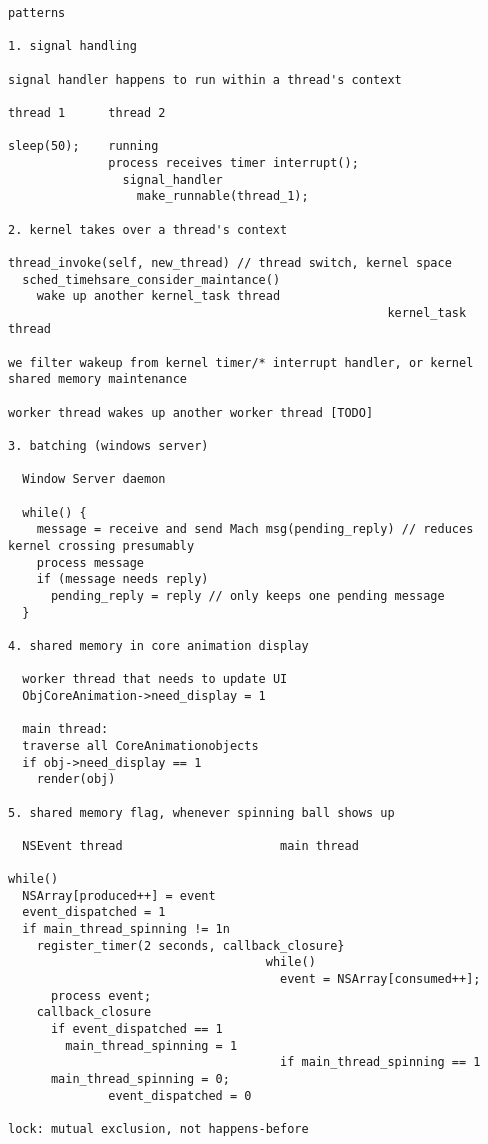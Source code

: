 \begin{verbatim}
patterns

1. signal handling

signal handler happens to run within a thread's context

thread 1      thread 2

sleep(50);    running
              process receives timer interrupt();
                signal_handler
                  make_runnable(thread_1);

2. kernel takes over a thread's context

thread_invoke(self, new_thread) // thread switch, kernel space
  sched_timehsare_consider_maintance()
    wake up another kernel_task thread
                                                     kernel_task thread

we filter wakeup from kernel timer/* interrupt handler, or kernel
shared memory maintenance

worker thread wakes up another worker thread [TODO]

3. batching (windows server)

  Window Server daemon

  while() {
    message = receive and send Mach msg(pending_reply) // reduces
kernel crossing presumably
    process message
    if (message needs reply)
      pending_reply = reply // only keeps one pending message
  }

4. shared memory in core animation display

  worker thread that needs to update UI
  ObjCoreAnimation->need_display = 1

  main thread:
  traverse all CoreAnimationobjects
  if obj->need_display == 1
    render(obj)

5. shared memory flag, whenever spinning ball shows up

  NSEvent thread                      main thread

while()
  NSArray[produced++] = event
  event_dispatched = 1
  if main_thread_spinning != 1n
    register_timer(2 seconds, callback_closure}
                                    while()
                                      event = NSArray[consumed++];
      process event;
    callback_closure
      if event_dispatched == 1
        main_thread_spinning = 1
                                      if main_thread_spinning == 1
      main_thread_spinning = 0;
              event_dispatched = 0

lock: mutual exclusion, not happens-before


\end{verbatim}
